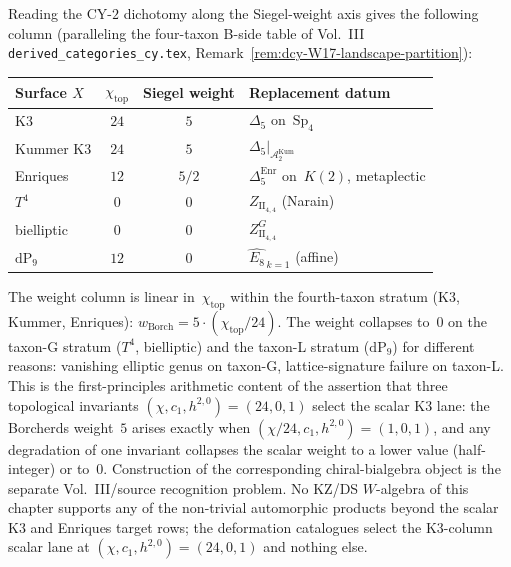 \begin{remark}
\label{rem:wac-W17-weight-column}
Reading the CY-$2$ dichotomy along the Siegel-weight axis gives
the following column (paralleling the four-taxon B-side table
of Vol.~III \texttt{derived\_categories\_cy.tex},
Remark~\ref{rem:dcy-W17-landscape-partition}):
\begin{center}
\begin{tabular}{lccl}
\toprule
Surface $X$ & $\chi_{\mathrm{top}}$ & Siegel weight & Replacement datum \\
\midrule
K3 & $24$ & $5$ & $\Delta_5$ on~$\mathrm{Sp}_4$ \\
Kummer K3 & $24$ & $5$ & $\Delta_5\big|_{\mathcal{A}_2^{\mathrm{Kum}}}$ \\
Enriques & $12$ & $5/2$ & $\Delta_5^{\mathrm{Enr}}$ on~$K(2)$, metaplectic \\
$T^4$ & $0$ & $0$ & $Z_{\mathrm{II}_{4,4}}$ (Narain) \\
bielliptic & $0$ & $0$ & $Z_{\mathrm{II}_{4,4}}^G$ \\
$\mathrm{dP}_9$ & $12$ & $0$ & $\widehat{E_8}_{\,k=1}$ (affine) \\
\bottomrule
\end{tabular}
\end{center}
The weight column is linear in~$\chi_{\mathrm{top}}$ within the
fourth-taxon stratum (K3, Kummer, Enriques):
$w_{\mathrm{Borch}} = 5\cdot(\chi_{\mathrm{top}}/24)$. The weight
collapses to~$0$ on the taxon-G stratum ($T^4$, bielliptic) and
the taxon-L stratum ($\mathrm{dP}_9$) for different
reasons: vanishing elliptic genus on taxon-G, lattice-signature
failure on taxon-L. This is the first-principles arithmetic
content of the assertion that three topological invariants
$(\chi, c_1, h^{2,0}) = (24, 0, 1)$ select the scalar K3 lane: the
Borcherds weight~$5$ arises exactly when
$(\chi/24, c_1, h^{2,0}) = (1, 0, 1)$, and any degradation of
one invariant collapses the scalar weight to a lower value
(half-integer) or to~$0$. Construction of the corresponding
chiral-bialgebra object is the separate Vol.~III/source recognition
problem. No KZ/DS $W$-algebra of this
chapter supports any of the non-trivial automorphic products
beyond the scalar K3 and Enriques target rows; the deformation
catalogues select the K3-column scalar lane at
$(\chi, c_1, h^{2,0}) = (24, 0, 1)$ and nothing else.
\end{remark}

